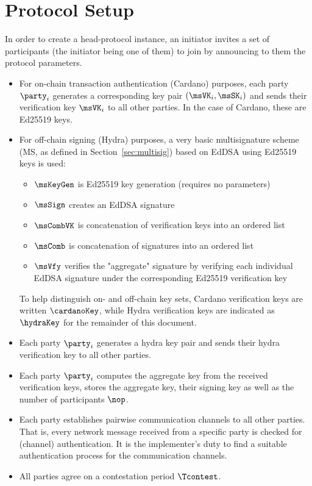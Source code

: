 \clearpage
\section{Protocol Setup}\label{sec:setup}
In order to create a head-protocol instance, an initiator invites a set of
participants (the initiator being one of them) to join by announcing to them the
protocol parameters.

\begin{itemize}
	\item For on-chain transaction authentication (Cardano) purposes, each party
	      $\party_i$ generates a corresponding key pair $(\msVK_{i},\msSK_{i})$
	      and sends their verification key $\msVK_{i}$ to all other parties. In
	      the case of Cardano, these are Ed25519 keys.

	\item For off-chain signing (Hydra) purposes, a very basic multisignature scheme (MS, as defined in Section~\ref{sec:multisig}) based on EdDSA using Ed25519 keys is used:
	      \begin{itemize}
		      \item $\msKeyGen$ is Ed25519 key generation (requires no parameters)
		      \item $\msSign$ creates an EdDSA signature
		      \item $\msCombVK$ is concatenation of verification keys into an ordered list
		      \item $\msComb$ is concatenation of signatures into an ordered list
		      \item $\msVfy$ verifies the "aggregate" signature by verifying each individual EdDSA signature under the corresponding Ed25519 verification key
	      \end{itemize}

        To help distinguish on- and off-chain key sets, Cardano verification
        keys are written $\cardanoKey$, while Hydra verification keys are
        indicated as $\hydraKey$ for the remainder of this document.
        

	\item Each party $\party_i$ generates a hydra key pair and sends their hydra verification key to all other parties.

	\item Each party $\party_i$ computes the aggregate key from the received verification keys, stores the aggregate key,
	      their signing key as well as the number of participants $\nop$.

	\item Each party establishes pairwise communication channels to all other parties. That is, every network message received from a specific party is checked for (channel) authentication. It is the implementer’s duty to find a suitable authentication process for the communication channels.

	\item All parties agree on a contestation period $\Tcontest$.
\end{itemize}

